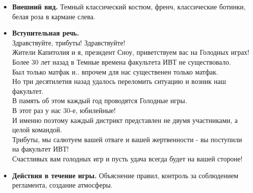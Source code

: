 
\begin{itemize}
\item \textbf{Внешний вид.} Темный классический костюм, френч, классические ботинки, белая роза в кармане слева.

\item \textbf{Вступительная речь.}\\
Здравствуйте, трибуты! Здравствуйте!\\
Жители Капитолия и я, президент Сноу, приветствуем вас на Голодных играх!\\
Более 30 лет назад в Темные времена факультета ИВТ не существовало.\\
Был только матфак и.. впрочем для нас существенен только матфак.\\
Но три десятилетия назад удалось переломить ситуацию и возник наш факультет.\\
В память об этом каждый год проводятся Голодные игры.\\
В этот раз у нас 30-е, юбилейные!\\
И именно поэтому каждый дистрикт представлен не двумя участниками, а целой командой.\\
Трибуты, мы салютуем вашей отваге и вашей жертвенности - вы поступили на факультет ИВТ!\\
Счастливых вам голодных игр и пусть удача всегда будет на вашей стороне!

\item \textbf{Действия в течение игры.} Объяснение правил, контроль за соблюдением регламента, создание атмосферы.
\end{itemize}